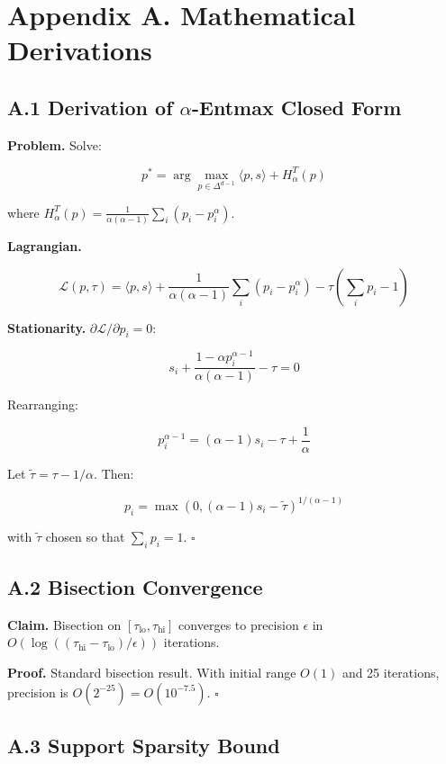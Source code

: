 
\section{Appendix A. Mathematical Derivations}

\subsection{A.1 Derivation of $\alpha$-Entmax Closed Form}

\textbf{Problem.} Solve:

\[
p^* = \arg\max_{p \in \Delta^{d-1}} \langle p, s \rangle + H_\alpha^T(p)
\tag{A.1}
\]

where $H_\alpha^T(p) = \frac{1}{\alpha(\alpha-1)} \sum_i (p_i - p_i^\alpha)$.

\textbf{Lagrangian.}

\[
\mathcal{L}(p, \tau) = \langle p, s \rangle + \frac{1}{\alpha(\alpha-1)} \sum_i (p_i - p_i^\alpha) - \tau \left(\sum_i p_i - 1\right)
\tag{A.2}
\]

\textbf{Stationarity.} $\partial \mathcal{L} / \partial p_i = 0$:

\[
s_i + \frac{1 - \alpha p_i^{\alpha-1}}{\alpha(\alpha-1)} - \tau = 0
\tag{A.3}
\]

Rearranging:

\[
p_i^{\alpha - 1} = (\alpha - 1) s_i - \tau + \frac{1}{\alpha}
\tag{A.4}
\]

Let $\tilde\tau = \tau - 1/\alpha$. Then:

\[
p_i = \max\left(0, (\alpha - 1) s_i - \tilde\tau\right)^{1/(\alpha - 1)}
\tag{A.5}
\]

with $\tilde\tau$ chosen so that $\sum_i p_i = 1$. $\square$

\subsection{A.2 Bisection Convergence}

\textbf{Claim.} Bisection on $[\tau_\text{lo}, \tau_\text{hi}]$ converges to 
precision $\epsilon$ in $O(\log((\tau_\text{hi} - \tau_\text{lo})/\epsilon))$ 
iterations.

\textbf{Proof.} Standard bisection result. With initial range $O(1)$ and 25 
iterations, precision is $O(2^{-25}) = O(10^{-7.5})$. $\square$

\subsection{A.3 Support Sparsity Bound}

